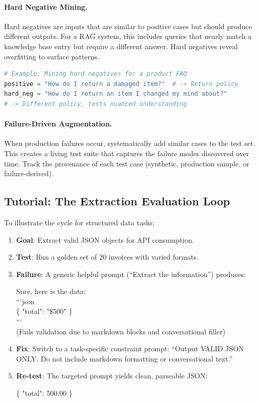 \paragraph{Hard Negative Mining.} Hard negatives are inputs that are similar to positive cases but should produce different outputs. For a RAG system, this includes queries that nearly match a knowledge base entry but require a different answer. Hard negatives reveal overfitting to surface patterns.\begin{lstlisting}[basicstyle=\small\ttfamily,language=Python]
# Example: Mining hard negatives for a product FAQ
positive = "How do I return a damaged item?"  # -> Return policy
hard_neg = "How do I return an item I changed my mind about?"  
# -> Different policy, tests nuanced understanding
\end{lstlisting}

\paragraph{Failure-Driven Augmentation.} When production failures occur, systematically add similar cases to the test set. This creates a living test suite that captures the failure modes discovered over time. Track the provenance of each test case (synthetic, production sample, or failure-derived).

\subsection{Tutorial: The Extraction Evaluation Loop}

To illustrate the cycle for structured data tasks:

\begin{enumerate}
    \item \textbf{Goal}: Extract valid JSON objects for API consumption.
    \item \textbf{Test}: Run a golden set of 20 invoices with varied formats.
    \item \textbf{Failure}: A generic helpful prompt (``Extract the information'') produces:
    \begin{badexample}
    Sure, here is the data:\\
    ```json\\
    \{ "total": "\$500" \}\\
    ```\\
    (Fails validation due to markdown blocks and conversational filler)
    \end{badexample}
    \item \textbf{Fix}: Switch to a task-specific constraint prompt: ``Output VALID JSON ONLY. Do not include markdown formatting or conversational text.''
    \item \textbf{Re-test}: The targeted prompt yields clean, parseable JSON:
    \begin{goodexample}
    \{ "total": 500.00 \}
    \end{goodexample}
\end{enumerate}

